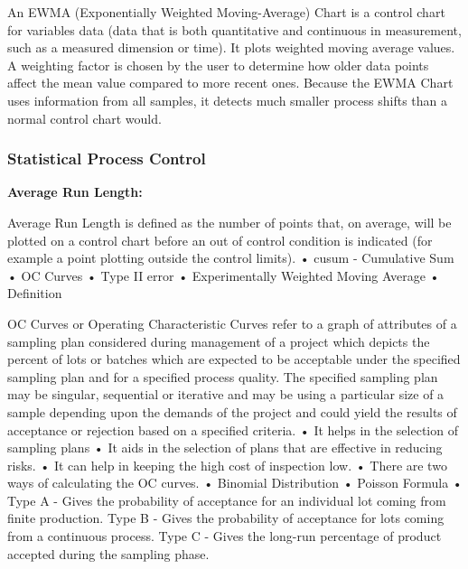 \begin{frame}
An EWMA (Exponentially Weighted Moving-Average) Chart is a control chart for variables data (data that is both quantitative and continuous in measurement, such as a measured dimension or time). It plots weighted moving average values. A weighting factor is chosen by the user to determine how older data points affect the mean value compared to more recent ones. Because the EWMA Chart uses information from all samples, it detects much smaller process shifts than a normal control chart would.

\end{frame}
\begin{frame}
\frametitle{Statistical Process Control}
\textbf{Average Run Length: }


Average Run Length is defined as the number of points that, on average, will be plotted on a control chart before an out of control condition is indicated (for example a point plotting outside the control limits).
•	cusum - Cumulative Sum 
•	OC Curves
•	Type II error
•	Experimentally Weighted Moving Average 
•	Definition 
\end{frame}
\begin{frame}
OC Curves or Operating Characteristic Curves refer to a graph of attributes of a sampling plan considered during management of a project which depicts the percent of lots or batches which are expected to be acceptable under the specified sampling plan and for a specified process quality. The specified sampling plan may be singular, sequential or iterative and may be using a particular size of a sample depending upon the demands of the project and could yield the results of acceptance or rejection based on a specified criteria.
•	It helps in the selection of sampling plans
•	It aids in the selection of plans that are effective in reducing risks.
•	It can help in keeping the high cost of inspection low.
•	There are two ways of calculating the OC curves.
•	Binomial Distribution
•	Poisson Formula
•	Type A - Gives the probability of acceptance for an individual lot coming from finite production. Type B - Gives the probability of acceptance for lots coming from a continuous process. Type C - Gives the long-run percentage of product accepted during the sampling phase.
\end{frame}
